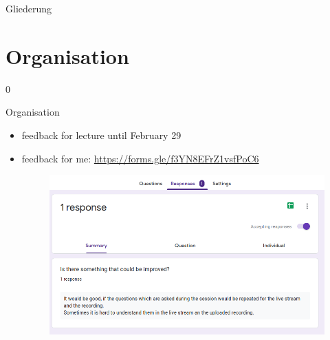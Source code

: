 \def\pascal{0}
\def\preview{1}









\begin{withoutheadline}
  \begin{withoutfootline}
    \begin{frame}
      \titlepagesecond
    \end{frame}
  \end{withoutfootline}

  \begin{frame}[shrink=10]{Gliederung}
    \tableofcontents[hideallsubsections]
  \end{frame}
\end{withoutheadline}

\setcounter{section}{-1}

\section{Organisation}

\if\pascal0{
  \begin{frame}{Organisation}
    \begin{itemize}
      \item \alert{feedback for lecture until February 29}
      \item \alert{feedback for me:} \url{https://forms.gle/f3YN8EFrZ1vsfPoC6}
      \begin{figure}
        \centering
        \includegraphics[height=0.3\paperheight]{./figures/feedback.png}
      \end{figure}
    \end{itemize}
  \end{frame}
}\fi

